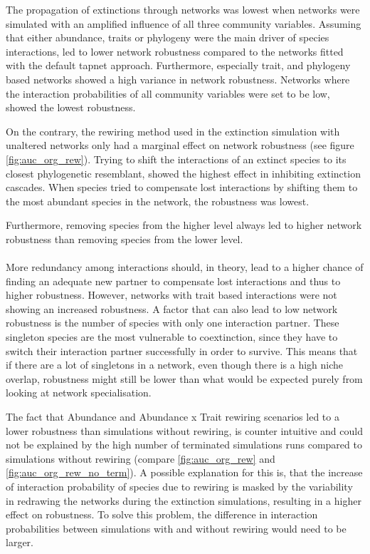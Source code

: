 \documentclass[12pt,a4paper]{article}
\begin{document}
The propagation of extinctions through networks was lowest when networks were simulated with an amplified influence of all three community variables. Assuming that either abundance, traits or phylogeny were the main driver of species interactions, led to lower network robustness compared to the networks fitted with the default tapnet approach. Furthermore, especially trait, and phylogeny based networks showed a high variance in network robustness. Networks where the interaction probabilities of all community variables were set to be low, showed the lowest robustness. \par

On the contrary, the rewiring method used in the extinction simulation with unaltered networks only had a marginal effect on network robustness (see figure \ref{fig:auc_org_rew}). Trying to shift the interactions of an extinct species to its closest phylogenetic resemblant, showed the highest effect in inhibiting extinction cascades. When species tried to compensate lost interactions by shifting them to the most abundant species in the network, the robustness was lowest.

Furthermore, removing species from the higher level always led to higher network robustness than removing species from the lower level.
\paragraph{}

More redundancy among interactions should, in theory, lead to a higher chance of finding an adequate new partner to compensate lost interactions and thus to higher robustness. However, networks with trait based interactions were not showing an increased robustness. A factor that can also lead to low network robustness is the number of species with only one interaction partner. These singleton species are the most vulnerable to coextinction, since they have to switch their interaction partner successfully in order to survive. This means that if there are a lot of singletons in a network, even though there is a high niche overlap, robustness might still be lower than what would be expected purely from looking at network specialisation.

The fact that Abundance and Abundance x Trait rewiring scenarios led to a lower robustness than simulations without rewiring, is counter intuitive and could not be explained by the high number of terminated simulations runs compared to simulations without rewiring (compare \ref{fig:auc_org_rew} and \ref{fig:auc_org_rew_no_term}). A possible explanation for this is, that the increase of interaction probability of species due to rewiring is masked by the variability in redrawing the networks during the extinction simulations, resulting in a higher effect on robustness. To solve this problem, the difference in interaction probabilities between simulations with and without rewiring would need to be larger.
\end{document}
